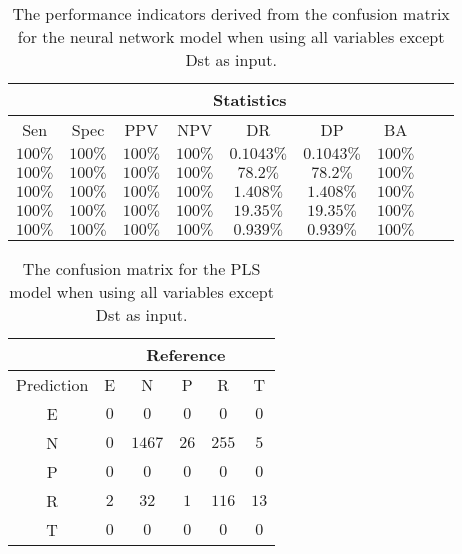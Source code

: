 \begin{table}[!ht]
	\centering
	\begin{tabular}{|c|c|c|c|c|c|c|c|c|}
		\hline
		 & \multicolumn{7}{c|}{Statistics} \\ \hline
		Sen & Spec & PPV & NPV & DR & DP & BA \\ \hline
		$100\%$ & $100\%$ & $100\%$ & $100\%$ & $0.1043\%$ & $0.1043\%$ & $100\%$ \\ \hline
		$100\%$ & $100\%$ & $100\%$ & $100\%$ & $78.2\%$ & $78.2\%$ & $100\%$ \\ \hline
		$100\%$ & $100\%$ & $100\%$ & $100\%$ & $1.408\%$ & $1.408\%$ & $100\%$ \\ \hline
		$100\%$ & $100\%$ & $100\%$ & $100\%$ & $19.35\%$ & $19.35\%$ & $100\%$ \\ \hline
		$100\%$ & $100\%$ & $100\%$ & $100\%$ & $0.939\%$ & $0.939\%$ & $100\%$ \\ \hline
	\end{tabular}
	\caption{The performance indicators derived from the confusion matrix for the neural network model when using all variables except Dst as input.}
	\label{tab:cs:noDst:nnet}
\end{table}

\begin{table}[!ht]
	\centering
	\begin{tabular}{|c|c|c|c|c|c|}
		\hline
		 & \multicolumn{5}{|c|}{Reference} \\ \hline
		 Prediction & E & N & P & R & T \\ \hline
		 E & $0$ & $0$ & $0$ & $0$ & $0$ \\ \hline
		 N & $0$ & $1467$ & $26$ & $255$ & $5$ \\ \hline
		 P & $0$ & $0$ & $0$ & $0$ & $0$ \\ \hline
		 R & $2$ & $32$ & $1$ & $116$ & $13$ \\ \hline
		 T & $0$ & $0$ & $0$ & $0$ & $0$ \\ \hline
	\end{tabular}
	\caption{The confusion matrix for the PLS model when using all variables except Dst as input.}
	\label{tab:cm:noDst:pls}
\end{table}

